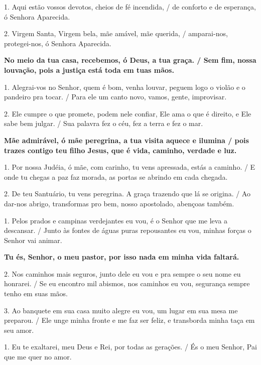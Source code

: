 \documentclass[a5paper,9pt]{extarticle}
\begin{document}
\begin{cantos}
\begin{canto}
1. Aqui estão vossos devotos, cheios de fé incendida, / de conforto e de esperança, ó Senhora Aparecida.

2. Virgem Santa, Virgem bela, mãe amável, mãe querida, / amparai-nos, protegei-nos, ó Senhora Aparecida.
\end{canto}

\begin{canto}
\textbf{No meio da tua casa, recebemos, ó Deus, a tua graça. / Sem fim, nossa louvação, pois a justiça está toda em tuas mãos.}

1. Alegrai-vos no Senhor, quem é bom, venha louvar, peguem logo o violão e o pandeiro pra tocar. / Para ele um canto novo, vamos, gente, improvisar.

2. Ele cumpre o que promete, podem nele confiar, Ele ama o que é direito, e Ele sabe bem julgar. / Sua palavra fez o céu, fez a terra e fez o mar.
\end{canto}

\begin{canto}
\textbf{Mãe admirável, ó mãe peregrina, a tua visita aquece e ilumina / pois trazes contigo teu filho Jesus, que é vida, caminho, verdade e luz.}

1. Por nossa Judéia, ó mãe, com carinho, tu vens apressada, estás a caminho. / E onde tu chegas a paz faz morada, as portas se abrindo em cada chegada.

2. De teu Santuário, tu vens peregrina. A graça trazendo que lá se origina. / Ao dar-nos abrigo, transformas pro bem, nosso apostolado, abençoas também.
\end{canto}

\begin{canto}
1. Pelos prados e campinas verdejantes eu vou, é o Senhor que me leva a descansar. / Junto às fontes de águas puras repousantes eu vou, minhas forças o Senhor vai animar.

\textbf{Tu és, Senhor, o meu pastor, por isso nada em minha vida faltará. }

2. Nos caminhos mais seguros, junto dele eu vou e pra sempre o seu nome eu honrarei. / Se eu encontro mil abismos, nos caminhos eu vou, segurança sempre tenho em suas mãos.

3. Ao banquete em sua casa muito alegre eu vou, um lugar em sua mesa me preparou. / Ele unge minha fronte e me faz ser feliz, e transborda minha taça em seu amor.
\end{canto}

\begin{canto}
1. Eu te exaltarei, meu Deus e Rei, por todas as gerações. / És o meu Senhor, Pai que me quer no amor.


\end{canto}
\end{cantos}
\end{document}
